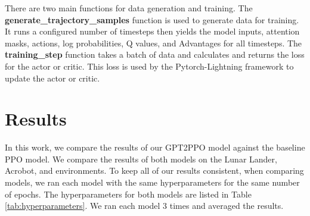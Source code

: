 \documentclass[conference]{IEEEtran}
\begin{document}
There are two main functions for data generation and training. The \textbf{generate\_trajectory\_samples} function is used to generate data for training. It runs a configured number of timesteps then yields the model inputs, attention masks, actions, log probabilities, Q values, and Advantages for all timesteps. The \textbf{training\_step} function takes a batch of data and calculates and returns the loss for the actor or critic. This loss is used by the Pytorch-Lightning framework to update the actor or critic.




\section{Results}
\label{sec:results}

In this work, we compare the results of our GPT2PPO model against the baseline PPO model. We compare the results of both models on the Lunar Lander, Acrobot, and environments. To keep all of our results consistent, when comparing models, we ran each model with the same hyperparameters for the same number of epochs. The hyperparameters for both models are listed in Table \ref{tab:hyperparameters}. We ran each model 3 times and averaged the results.
\end{document}
